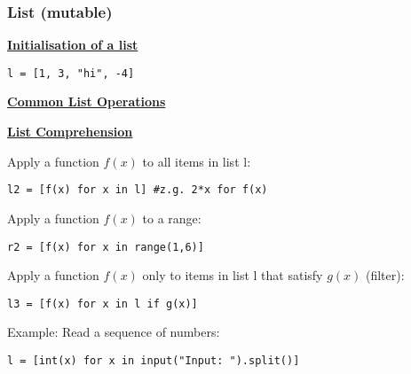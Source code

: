 \subsubsection{List (mutable)}
{\centering\underline{\textbf{Initialisation of a list}} \par}
\begin{lstlisting}
l = [1, 3, "hi", -4]
\end{lstlisting}

{\centering\underline{\textbf{Common List Operations}} \par}


{\centering\underline{\textbf{List Comprehension}} \par}
Apply a function $f(x)$ to all items in list l:
\begin{lstlisting}
l2 = [f(x) for x in l] #z.g. 2*x for f(x)
\end{lstlisting}
Apply a function $f(x)$ to a range:
\begin{lstlisting}
r2 = [f(x) for x in range(1,6)]
\end{lstlisting}
Apply a function $f(x)$ only to items in list l that satisfy $g(x)$ (filter):
\begin{lstlisting}
l3 = [f(x) for x in l if g(x)]
\end{lstlisting}
Example: Read a sequence of numbers:
\begin{lstlisting}
l = [int(x) for x in input("Input: ").split()]
\end{lstlisting}